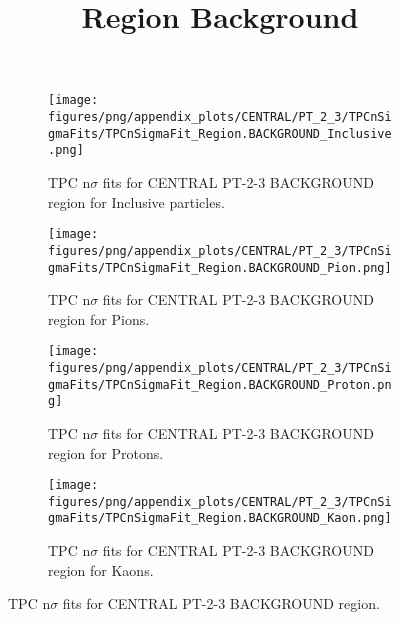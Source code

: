             \begin{figure}[H]
                \title{Region Background}
                \begin{subfigure}[b]{0.5\textwidth}
                    \centering
                    \texttt{[image: figures/png/appendix\_plots/CENTRAL/PT\_2\_3/TPCnSigmaFits/TPCnSigmaFit\_Region.BACKGROUND\_Inclusive.png]}
                    \caption{TPC n$\sigma$ fits for CENTRAL PT-2-3 BACKGROUND region for Inclusive particles.}
                    \label{fig:appendix_CENTRAL_PT-2-3_BACKGROUND_Inclusive}
                \end{subfigure}
                \begin{subfigure}[b]{0.5\textwidth}
                    \centering
                    \texttt{[image: figures/png/appendix\_plots/CENTRAL/PT\_2\_3/TPCnSigmaFits/TPCnSigmaFit\_Region.BACKGROUND\_Pion.png]}
                    \caption{TPC n$\sigma$ fits for CENTRAL PT-2-3 BACKGROUND region for Pions.}
                    \label{fig:appendix_CENTRAL_PT-2-3_BACKGROUND_Pion}
                \end{subfigure}
                \begin{subfigure}[b]{0.5\textwidth}
                    \centering
                    \texttt{[image: figures/png/appendix\_plots/CENTRAL/PT\_2\_3/TPCnSigmaFits/TPCnSigmaFit\_Region.BACKGROUND\_Proton.png]}
                    \caption{TPC n$\sigma$ fits for CENTRAL PT-2-3 BACKGROUND region for Protons.}
                    \label{fig:appendix_CENTRAL_PT-2-3_BACKGROUND_Proton}
                \end{subfigure}
                \begin{subfigure}[b]{0.5\textwidth}
                    \centering
                    \texttt{[image: figures/png/appendix\_plots/CENTRAL/PT\_2\_3/TPCnSigmaFits/TPCnSigmaFit\_Region.BACKGROUND\_Kaon.png]}
                    \caption{TPC n$\sigma$ fits for CENTRAL PT-2-3 BACKGROUND region for Kaons.}
                    \label{fig:appendix_CENTRAL_PT-2-3_BACKGROUND_Kaon}
                \end{subfigure}
                \caption{TPC n$\sigma$ fits for CENTRAL PT-2-3 BACKGROUND region.}
                \label{fig:appendix_CENTRAL_PT-2-3_BACKGROUND}
            \end{figure}
            \clearpage
            
    
